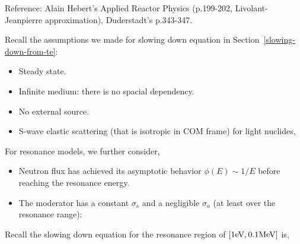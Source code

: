 \documentclass{school-22.211-notes}
\date{February 29, 2012}
\begin{document}
\maketitle




\clearpage
{}
Reference: Alain Hebert's Applied Reactor Physics (p.199-202, Livolant-Jeanpierre approximation), Duderstadt's p.343-347. 

Recall the assumptions we made for slowing down equation in Section~\ref{slowing-down-from-te}: 
\begin{itemize}
\item Steady state.
\item Infinite medium: there is no spacial dependency. 
\item No external source. 
\item S-wave elastic scattering (that is isotropic in COM frame) for light nuclides, 
\end{itemize}

For resonance models, we further consider, 
\begin{itemize}
\item Neutron flux has achieved its asymptotic behavior $\phi(E) \sim 1/E$ before reaching the resonance energy. 
\item The moderator has a constant $\sigma_s$ and a negligible $\sigma_a$ (at least over the resonance range): 
\end{itemize}

Recall the slowing down equation for the resonance region of $[1\mathrm{eV}, 0.1 \mathrm{MeV}]$ is, 


\end{document}

